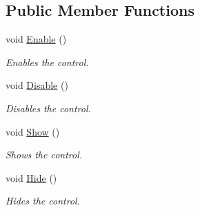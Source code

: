 \subsection*{Public Member Functions}
\begin{DoxyCompactItemize}
\item 
void \hyperlink{interface_tri_devs_1_1_tri_engine_1_1_u_i_1_1_i_control_a1d3966a21348944a6b34bc593e014ce8}{Enable} ()
\begin{DoxyCompactList}\small\item\em Enables the control. \end{DoxyCompactList}\item 
void \hyperlink{interface_tri_devs_1_1_tri_engine_1_1_u_i_1_1_i_control_a6c8bc280f9737e73f26ceb4d92e7c911}{Disable} ()
\begin{DoxyCompactList}\small\item\em Disables the control. \end{DoxyCompactList}\item 
void \hyperlink{interface_tri_devs_1_1_tri_engine_1_1_u_i_1_1_i_control_aa83e5f630e9ff4bc771984254b366fff}{Show} ()
\begin{DoxyCompactList}\small\item\em Shows the control. \end{DoxyCompactList}\item 
void \hyperlink{interface_tri_devs_1_1_tri_engine_1_1_u_i_1_1_i_control_aedb69ba1ee6d95a3df0fe42710799a3f}{Hide} ()
\begin{DoxyCompactList}\small\item\em Hides the control. \end{DoxyCompactList}\end{DoxyCompactItemize}
